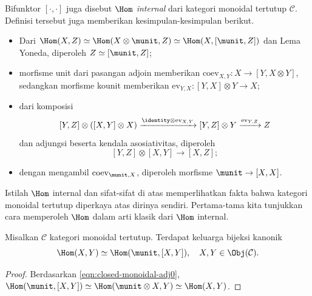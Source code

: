 Bifunktor $[\cdot,\cdot]$ juga disebut \emph{$\Hom$ internal} dari kategori
monoidal tertutup $\mathcal{C}$. Definisi tersebut juga memberikan
kesimpulan-kesimpulan berikut.
\begin{itemize}
	\item Dari
	$\Hom(X,Z)\simeq\Hom(X\otimes\munit,Z)\simeq\Hom(X,[\munit,Z])$ dan Lema
	Yoneda, diperoleh $Z\simeq[\munit,Z]$;
	\item morfisme unit dari pasangan adjoin memberikan
	$\mathrm{coev}_{X,Y}:X\to[Y,X\otimes Y]$, sedangkan morfisme kounit
	memberikan $\mathrm{ev}_{Y,X}:[Y,X]\otimes Y\to X$;
	\item dari komposisi
	\[ [Y, Z] \otimes ([X, Y] \otimes X) \xrightarrow{\identity \otimes \mathrm{ev}_{X, Y}} [Y, Z] \otimes Y \xrightarrow{\mathrm{ev}_{Y, Z}} Z \]
	dan adjungsi beserta kendala asosiativitas, diperoleh
	\[ [Y, Z] \otimes [X, Y] \to [X, Z]; \]
	\item dengan mengambil $\mathrm{coev}_{\munit,X}$, diperoleh morfisme
	$\munit\to[X,X]$.
\end{itemize}

Istilah $\Hom$ internal dan sifat-sifat di atas memperlihatkan fakta bahwa
kategori monoidal tertutup diperkaya atas dirinya sendiri. Pertama-tama kita
tunjukkan cara memperoleh $\Hom$ dalam arti klasik dari $\Hom$ internal.

\begin{proposition}
	Misalkan $\mathcal{C}$ kategori monoidal tertutup. Terdapat keluarga bijeksi
	kanonik
	\[ \Hom(X, Y) \simeq \Hom(\munit, [X, Y]), \quad X, Y \in \Obj(\mathcal{C}). \]
\end{proposition}

\begin{proof}
	Berdasarkan \eqref{eqn:closed-monoidal-adj0},
	$\Hom(\munit,[X,Y])\simeq\Hom(\munit\otimes X,Y)\simeq\Hom(X,Y)$.
\end{proof}

